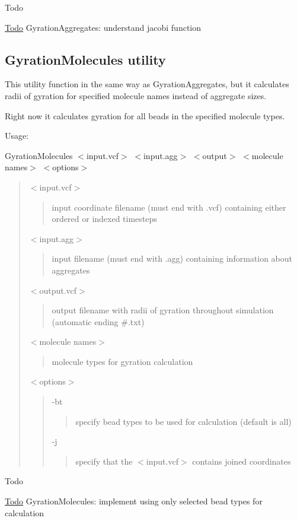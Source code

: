 \begin{DoxyRefDesc}{Todo}
\item[\hyperlink{todo__todo000003}{Todo}]Gyration\+Aggregates\+: understand {\ttfamily jacobi} function\end{DoxyRefDesc}
\hypertarget{Common_GyrationMolecules}{}\subsection{Gyration\+Molecules utility}\label{Common_GyrationMolecules}
This utility function in the same way as Gyration\+Aggregates, but it calculates radii of gyration for specified molecule names instead of aggregate sizes.

Right now it calculates gyration for all beads in the specified molecule types.

Usage\+:

{\ttfamily Gyration\+Molecules $<$input.\+vcf$>$ $<$input.\+agg$>$ $<$output$>$ $<$molecule names$>$ $<$options$>$}

\begin{quote}
{\ttfamily $<$input.\+vcf$>$} \begin{quote}
input coordinate filename (must end with {\ttfamily .vcf}) containing either ordered or indexed timesteps \end{quote}
{\ttfamily $<$input.\+agg$>$} \begin{quote}
input filename (must end with {\ttfamily .agg}) containing information about aggregates \end{quote}
{\ttfamily $<$output.\+vcf$>$} \begin{quote}
output filename with radii of gyration throughout simulation (automatic ending \#.txt) \end{quote}
{\ttfamily $<$molecule names$>$} \begin{quote}
molecule types for gyration calculation \end{quote}
{\ttfamily $<$options$>$} \begin{quote}
{\ttfamily -\/bt} \begin{quote}
specify bead types to be used for calculation (default is all) \end{quote}
{\ttfamily -\/j} \begin{quote}
specify that the {\ttfamily $<$input.\+vcf$>$} contains joined coordinates \end{quote}
\end{quote}
\end{quote}


\begin{DoxyRefDesc}{Todo}
\item[\hyperlink{todo__todo000004}{Todo}]Gyration\+Molecules\+: implement using only selected bead types for calculation\end{DoxyRefDesc}


